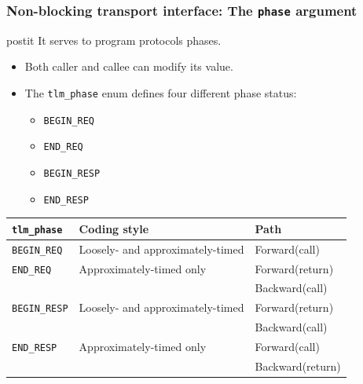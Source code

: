 {\begin{frame}
	\frametitle{\small Non-blocking transport interface: The \texttt{phase} argument}
	\vspace{0.4em}
	\begin{beamercolorbox}[center,rounded=true,wd=\textwidth]{postit}
		It serves to program protocols phases.
	\end{beamercolorbox}
	\begin{itemize}
		\item<1-> Both caller and callee can modify its value.
		\item The \texttt{tlm\_phase} enum defines four different phase status:
		\begin{itemize}
			\item<1-> \texttt{BEGIN\_REQ}
			\item<1-> \texttt{END\_REQ}
			\item<1-> \texttt{BEGIN\_RESP}
			\item<1-> \texttt{END\_RESP}
		\end{itemize}
	\end{itemize}
	\vspace{-0.9em}
	\begin{center}{
	\scriptsize
	\begin{tabular}{|l|l|l|}
		\hline
		\texttt{\textbf{tlm\_phase}} & \textbf{Coding style} & \textbf{Path} \\
		\hline
		\texttt{BEGIN\_REQ} & Loosely- and approximately-timed & Forward(call) \\
		\hline
		\texttt{END\_REQ} & Approximately-timed only & Forward(return) \\
		& & Backward(call) \\
		\hline
		\texttt{BEGIN\_RESP} & Loosely- and approximately-timed & Forward(return) \\
		& & Backward(call) \\
		\hline
		\texttt{END\_RESP} & Approximately-timed only & Forward(call) \\
		& & Backward(return) \\
		\hline
	\end{tabular}
	}
	\end{center}
\end{frame}

}
